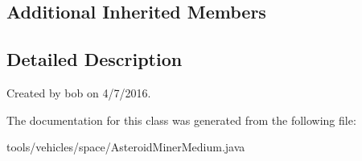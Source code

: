 \subsection*{Additional Inherited Members}


\subsection{Detailed Description}
Created by bob on 4/7/2016. 

The documentation for this class was generated from the following file\+:\begin{DoxyCompactItemize}
\item 
tools/vehicles/space/Asteroid\+Miner\+Medium.\+java\end{DoxyCompactItemize}
